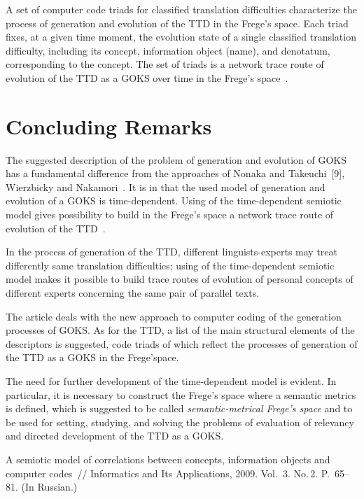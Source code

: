 \begin{multicols}{2}
   A set of computer code triads for classified translation difficulties characterize the process of 
generation and evolution of the TTD in the Frege's space. Each triad fixes, at a given time 
moment, the evolution state of a single classified translation difficulty, including its concept, 
information object (name), and denotatum, corresponding to the concept. The set of triads is a 
network trace route of evolution of the TTD as a GOKS over time in the Frege's 
space~\cite{1bun}.

\section{Concluding Remarks}

\noindent
The suggested description of the problem of \mbox{generation} and evolution of GOKS has a 
fundamental difference from the approaches of Nonaka and Takeuchi~[9], Wierzbicky and 
Nakamori~\cite{11bun, 12bun}. It is in that the used model of generation and evolution of 
a GOKS is time-dependent. Using of the time-dependent semiotic model gives possibility to 
build in the Frege's space a network trace route of evolution of the TTD~\cite{1bun}.
   
   In the process of generation of the TTD, different linguists-experts may treat differently same 
translation difficulties; using of the time-dependent semiotic model makes it possible to build 
trace routes of evolution of personal concepts of different experts concerning the same pair of 
parallel texts.
   
   The article deals with the new approach to computer coding of the generation processes of 
GOKS. As for the TTD, a list of the main structural elements of the descriptors is suggested, 
code triads of which reflect the processes of generation of the TTD as a GOKS in the 
Frege'space.
   
   The need for further development of the time-dependent model is evident. In particular, it is 
necessary to construct the Frege's space where a semantic metrics is defined, which is suggested 
to be called \textit{semantic-metrical Frege's space} and to be used for setting, studying, and 
solving the problems of evaluation of relevancy and directed development of the TTD as a GOKS.
   
{\small\frenchspacing
{%
\begin{thebibliography}{99}

    
     A semiotic model of correlations between concepts, information objects and computer 
codes~// Informatics and Its Applications, 2009. Vol.~3. No.\,2.  P.~65--81. (In Russian.)


\end{thebibliography}}}
\end{multicols}
